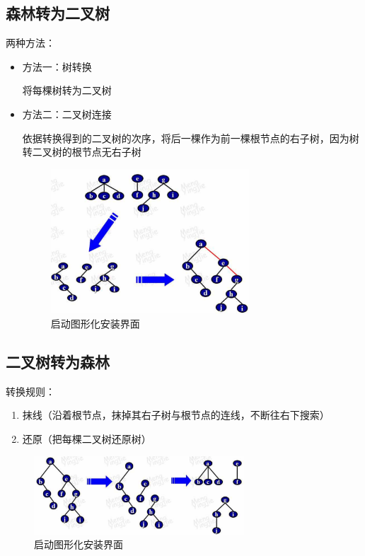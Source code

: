 \documentclass[AutoFakeBold]{LZUThesis2007}
\begin{document}
		\subsection{森林转为二叉树}
		两种方法：
		\begin{itemize}
			\item 方法一：树转换

			将每棵树转为二叉树
			\item 方法二：二叉树连接
		
			依据转换得到的二叉树的次序，将后一棵作为前一棵根节点的右子树，因为树转二叉树的根节点无右子树
			\begin{figure}[H]
			    \centering
			    \includegraphics[width=0.7\textwidth]{figures/7.4.png}
			    \caption{启动图形化安装界面}
			    \label{fig_install_texlive}
			\end{figure}
		\end{itemize}

		\subsection{二叉树转为森林}
		转换规则：
		\begin{enumerate}
			\item 抹线（沿着根节点，抹掉其右子树与根节点的连线，不断往右下搜索）
			\item 还原（把每棵二叉树还原树）
		\end{enumerate}
		\begin{figure}[H]
		    \centering
		    \includegraphics[width=0.7\textwidth]{figures/7.5.png}
		    \caption{启动图形化安装界面}
		    \label{fig_install_texlive}
		\end{figure}
\end{document}
